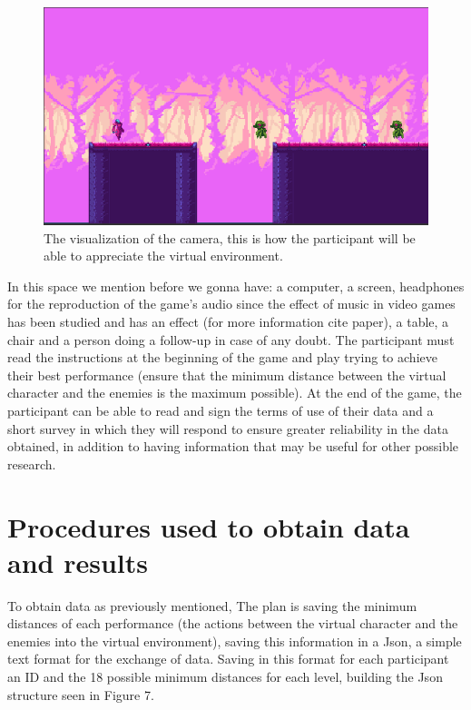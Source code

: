 \begin{figure}[ht]
    \centering
      \includegraphics[width=\linewidth]{Figures/cameraview.png}
      \caption{The visualization of the camera, this is how the participant will be able to appreciate the virtual environment.}
    \label{fig:example}
\end{figure}

In this space we mention before we gonna have: a computer, a screen, headphones for the reproduction of the game's audio since the effect of music in video games has been studied and has an effect (for more information cite paper), a table, a chair and a person doing a follow-up in case of any doubt. The participant must read the instructions at the beginning of the game and play trying to achieve their best performance (ensure that the minimum distance between the virtual character and the enemies is the maximum possible).
At the end of the game, the participant can be able to read and sign the terms of use of their data and a short survey in which they will respond to ensure greater reliability in the data obtained, in addition to having information that may be useful for other possible research.

\section{Procedures used to obtain data and results}
To obtain data as previously mentioned, The plan is saving the minimum distances of each performance (the actions between the virtual character and the enemies into the virtual environment), saving this information in a Json, a simple text format for the exchange of data. Saving in this format for each participant an ID and the 18 possible minimum distances for each level, building the Json structure seen in Figure 7.

